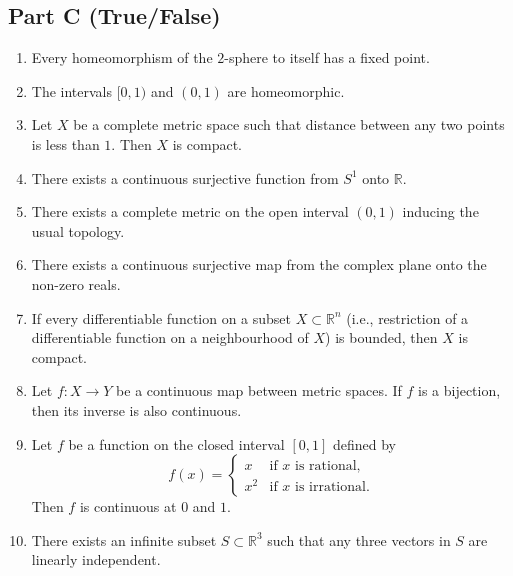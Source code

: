 \documentclass[11pt, a4paper]{article}
\begin{document}
\subsection*{Part C (True/False)}
\begin{enumerate}[resume]
  \item Every homeomorphism of the $2$-sphere to itself has a fixed point.
  \item The intervals $[0, 1)$ and $(0, 1)$ are homeomorphic.
  \item Let $X$ be a complete metric space such that distance between any two points is less than $1$. Then $X$ is compact.
  \item There exists a continuous surjective function from $S^1$ onto $\mathbb{R}$.
  \item There exists a complete metric on the open interval $(0, 1)$ inducing the usual topology.
  \item There exists a continuous surjective map from the complex plane onto the non-zero reals.
  \item If every differentiable function on a subset $X \subset \mathbb{R}^n$ (i.e., restriction of a differentiable function on a neighbourhood of $X$) is bounded, then $X$ is compact.
  \item Let $f: X \to Y$ be a continuous map between metric spaces. If $f$ is a bijection, then its inverse is also continuous.
  \item Let $f$ be a function on the closed interval $[0, 1]$ defined by
  \[
    f(x) = \begin{cases} x & \text{if } x \text{ is rational,} \\ x^2 & \text{if } x \text{ is irrational.} \end{cases}
  \]
  Then $f$ is continuous at $0$ and $1$.
  \item There exists an infinite subset $S \subset \mathbb{R}^3$ such that any three vectors in $S$ are linearly independent.
\end{enumerate}
\end{document}
